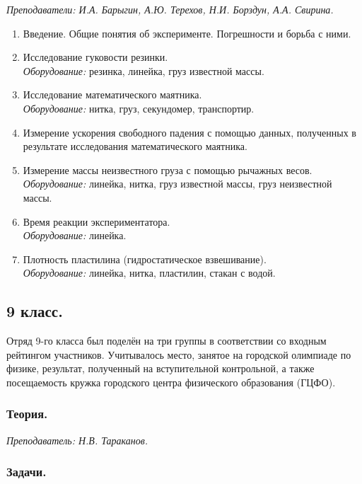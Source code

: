 \documentclass[12pt]{article}
\newlength{\h}
\newlength{\x}
\begin{document}
\textit{Преподаватели: И.А. Барыгин, А.Ю. Терехов, Н.И. Борздун, А.А. Свирина.}\\

\begin{enumerate}
\item Введение. Общие понятия об эксперименте. Погрешности и борьба с
  ними.
\item Исследование гуковости резинки. \\
  \textit{Оборудование:} резинка, линейка, груз известной массы.
\item Исследование математического маятника. \\
  \textit{Оборудование:} нитка, груз, секундомер, транспортир.
\item Измерение ускорения свободного падения с помощью данных,
  полученных в результате исследования математического маятника.
\item Измерение массы неизвестного груза с помощью рычажных весов. \\
  \textit{Оборудование:} линейка, нитка, груз известной массы,
  груз неизвестной массы. 
\item Время реакции экспериментатора. \\
  \textit{Оборудование:} линейка.
\item Плотность пластилина (гидростатическое взвешивание). \\
  \textit{Оборудование:} линейка, нитка, пластилин, стакан с водой. 
\end{enumerate}

\subsection{9 класс.}
\label{sec:daily9}

Отряд 9-го класса был поделён на три группы в соответствии со входным
рейтингом участников. Учитывалось место, занятое на городской
олимпиаде по физике, результат, полученный на вступительной
контрольной, а также посещаемость кружка городского центра физического
образования (ГЦФО). 

\subsubsection{Теория.}
\label{sec:daily9th}

\textit{Преподаватель: Н.В. Тараканов.}\\

\subsubsection{Задачи.}
\label{sec:daily9pr}
\end{document}

